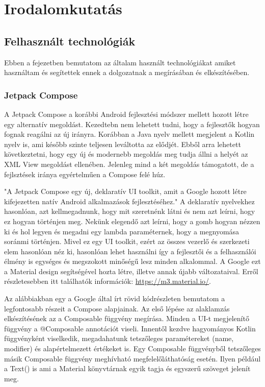 \chapter{Irodalomkutatás}
\label{sec:Search}

\section{Felhasznált technológiák}
\label{sec:Technologies}

Ebben a fejezetben bemutatom az általam használt technológiákat amiket használtam és segítettek ennek a dolgozatnak a megírásában és elkészítésében.

\subsection{Jetpack Compose}

A Jetpack Compose a korábbi Android fejlesztési módszer mellett hozott létre egy alternatív megoldást.
Kezedtebn nem lehetett tudni, hogy a fejlesztők hogyan fognak reagálni az új irányra.
Korábban a Java nyelv mellett megjelent a Kotlin nyelv is, ami később szinte teljesen leváltotta az elődjét.
Ebből arra lehetett következtetni, hogy egy új és modernebb megoldás meg tudja állni a helyét az XML View megoldást ellenében.
Jelenleg mind a két megoldás támogatott, de a fejlsztések iránya egyértelműen a Compose felé húz.

"A Jetpack Compose egy új, deklaratív UI toolkit, amit a Google hozott létre kifejezetten natív Android alkalmazások fejlesztéséhez."\cite{GettingStartedWithJetpackCompose}
A deklaratív nyelvekhez hasonlóan, azt kellmegadnunk, hogy mit szeretnénk látni és nem azt leírni, hogy ez hogyan történjen meg.
Nekünk elegendő azt leírni, hogy a gomb hogyan nézzen ki és hol legyen és megadni egy lambda paraméternek, hogy a megnyomása soránmi történjen.
Mivel ez egy UI toolkit, ezért az összes vezerlő és szerkezeti elem hasonlóan néz ki, hasonlóan lehet használni így a fejlesztői és a felhasználói élmény is egységes és megszokott minőségű lesz minden alkalommal.
A Google ezt a Material design segítségével hozta létre, illetve annak újabb változataival. Erről részletesebben itt találhatók információk: \url{https://m3.material.io/}.

Az alábbiakban egy a Google által írt rövid kódrészleten bemutatom a legfontosabb részeit a Compose alapjainak.\cite{BasicCodelab}
Az első lépése az alaklamzás elkészítésének az a Composable függvény megírása.
Minden a UI-t megjelenítő függvény a @Composable annotációt viseli.
Innentől kezdve hagyományos Kotlin függvényként viselkedik, megadahatunk tetszőleges paramétereket (name, modifier) és alapértelmezett értékeket is.
Egy Composable függvényből tetszőleges másik Composable függvény meghívható megfelelőláthatóság esetén.
Ilyen például a Text() is ami a Material könyvtárnak egyik tagja és egyszerű szöveget jelenít meg.

